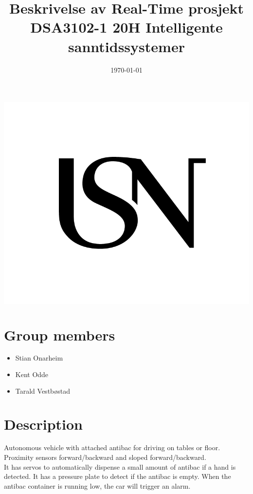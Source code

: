 \documentclass{article}
\title{Beskrivelse av Real-Time prosjekt \large\\
DSA3102-1 20H Intelligente sanntidssystemer}
\date{\today}
\begin{document}
\maketitle
\thispagestyle{empty}
\begin{center}
\includegraphics[width=\linewidth,height=0.2\textheight,keepaspectratio]{img/USN.png}
\end{center}


\newpage
\section{Group members}
	\begin{itemize}
		\item{Stian Onarheim}
		\item{Kent Odde}
		\item{Tarald Vestbøstad}
	\end{itemize}
\section{Description}
	Autonomous vehicle with attached antibac for driving on tables or floor.\\
	Proximity sensors forward/backward and sloped forward/backward.\\

	It has servos to automatically dispense a small amount of antibac if a hand is detected. It has a pressure plate to detect if the antibac is empty. When the antibac container is running low, the car will trigger an alarm. 
\end{document}
